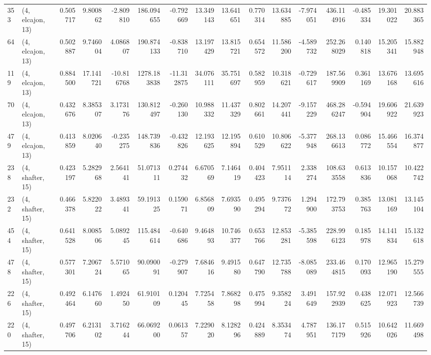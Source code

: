 \begin{tabular}{llrrrrrrrrrrrrrr}
353 &  (4, elcajon, 13) &   0.505717 &   9.800862 &  -2.809810 &   186.094655 &  -0.792669 &  13.349143 &  13.641651 &  0.770314 &  13.634885 &  -7.974051 &   436.114916 & -0.485334 &  19.301022 &  20.883365 \\
64  &  (4, elcajon, 13) &   0.502887 &   9.746004 &   4.086807 &   190.874133 &  -0.838710 &  13.197429 &  13.815721 &  0.654572 &  11.586200 &  -4.589732 &   252.268029 &  0.140818 &  15.205341 &  15.882948 \\
119 &  (4, elcajon, 13) &   0.884500 &  17.141721 & -10.816768 &  1278.183838 & -11.312875 &  34.076111 &  35.751697 &  0.582959 &  10.318621 &  -0.729617 &   187.569909 &  0.361169 &  13.676168 &  13.695616 \\
70  &  (4, elcajon, 13) &   0.432676 &   8.385307 &   3.173176 &   130.812497 &  -0.260130 &  10.988332 &  11.437329 &  0.802661 &  14.207441 &  -9.157229 &   468.286247 & -0.594904 &  19.606922 &  21.639923 \\
479 &  (4, elcajon, 13) &   0.413859 &   8.020640 &  -0.235275 &   148.739836 &  -0.432826 &  12.193625 &  12.195894 &  0.610529 &  10.806622 &  -5.377948 &   268.136613 &  0.086772 &  15.466554 &  16.374877 \\
238 &  (4, shafter, 15) &   0.423197 &   5.282968 &   2.564141 &    51.071311 &   0.274432 &   6.670569 &   7.146419 &  0.404423 &   7.951114 &   2.338274 &   108.633558 &  0.613836 &  10.157068 &  10.422742 \\
232 &  (4, shafter, 15) &   0.466378 &   5.822022 &   3.489341 &    59.191325 &   0.159071 &   6.856809 &   7.693590 &  0.495294 &   9.737672 &   1.294900 &   172.793753 &  0.385763 &  13.081169 &  13.145104 \\
454 &  (4, shafter, 15) &   0.641528 &   8.008506 &   5.089245 &   115.484614 &  -0.640686 &   9.464893 &  10.746377 &  0.653766 &  12.853281 &  -5.385598 &   228.996123 &  0.185978 &  14.141834 &  15.132618 \\
478 &  (4, shafter, 15) &   0.577301 &   7.206724 &   5.571065 &    90.090091 &  -0.279907 &   7.684616 &   9.491580 &  0.647790 &  12.735788 &  -8.085089 &   233.464815 &  0.170093 &  12.965190 &  15.279555 \\
226 &  (4, shafter, 15) &   0.492464 &   6.147660 &   1.492450 &    61.910109 &   0.120445 &   7.725458 &   7.868298 &  0.475994 &   9.358224 &   3.491649 &   157.922939 &  0.438625 &  12.071923 &  12.566739 \\
220 &  (4, shafter, 15) &   0.497706 &   6.213102 &   3.716244 &    66.069200 &   0.061357 &   7.229020 &   8.128296 &  0.424889 &   8.353474 &   4.787951 &   136.177179 &  0.515926 &  10.642026 &  11.669498 \\

\end{tabular}
